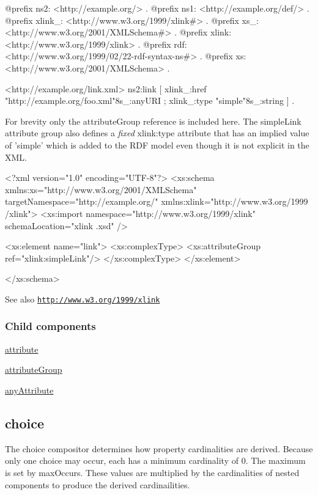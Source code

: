 \begin{DoxyCodeInclude}
@prefix ns2:     <http://example.org/> .
@prefix ns1:     <http://example.org/def/> .
@prefix xlink_:  <http://www.w3.org/1999/xlink#> .
@prefix xs_:     <http://www.w3.org/2001/XMLSchema#> .
@prefix xlink:   <http://www.w3.org/1999/xlink> .
@prefix rdf:     <http://www.w3.org/1999/02/22-rdf-syntax-ns#> .
@prefix xs:      <http://www.w3.org/2001/XMLSchema> .

<http://example.org/link.xml>
      ns2:link
              [ xlink_:href "http://example.org/foo.xml"^^xs_:anyURI ;
                xlink_:type "simple"^^xs_:string
              ] .
\end{DoxyCodeInclude}


For brevity only the attributeGroup reference is included here. The simpleLink attribute group also defines a {\itshape fixed\/} xlink:type attribute that has an implied value of 'simple' which is added to the RDF model even though it is not explicit in the XML.


\begin{DoxyCodeInclude}
<?xml version="1.0" encoding="UTF-8"?>
<xs:schema xmlns:xs="http://www.w3.org/2001/XMLSchema"
        targetNamespace="http://example.org/" xmlns:xlink="http://www.w3.org/1999
      /xlink">
        <xs:import namespace="http://www.w3.org/1999/xlink" schemaLocation="xlink
      .xsd" />

        <xs:element name="link">
                <xs:complexType>
                        <xs:attributeGroup ref="xlink:simpleLink"/>
                </xs:complexType>
        </xs:element>

</xs:schema>
\end{DoxyCodeInclude}


\begin{DoxySeeAlso}{See also}
\href{http://www.w3.org/1999/xlink}{\tt http://www.w3.org/1999/xlink}
\end{DoxySeeAlso}
\hypertarget{list_annotationChildren}{}\subsubsection{Child components}\label{list_annotationChildren}

\begin{DoxyItemize}
\item \hyperlink{attribute}{attribute}
\item \hyperlink{attributegroup}{attributeGroup}
\item \hyperlink{anyattribute}{anyAttribute} 
\end{DoxyItemize}\hypertarget{choice}{}\subsection{choice}\label{choice}
The choice compositor determines how property cardinalities are derived. Because only one choice may occur, each has a minimum cardinality of 0. The maximum is set by maxOccurs. These values are multiplied by the cardinalities of nested components to produce the derived cardinailities.

